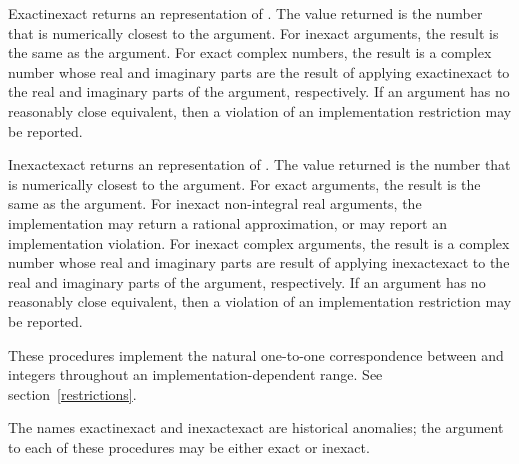 \begin{entry}{%
}

{\cf Exact\coerce{}inexact} returns an  representation of .
The value returned is the
 number that is numerically closest to the argument.  
For inexact arguments, the result is the same as the argument. For exact
complex numbers, the result is a complex number whose real and imaginary
parts are the result of applying {\cf exact\coerce{}inexact} to the real
and imaginary parts of the argument, respectively.
If an  argument has no reasonably close  equivalent,
then a violation of an implementation restriction may be reported.

{\cf Inexact\coerce{}exact} returns an  representation of
.  The value returned is the  number that is numerically
closest to the argument.
For exact arguments, the result is the same as the argument. For inexact
non-integral real arguments, the implementation may return a rational
approximation, or may report an implementation violation. For inexact
complex arguments, the result is a complex number whose real and
imaginary parts are result of applying {\cf inexact\coerce{}exact} to the
real and imaginary parts of the argument, respectively.
If an  argument has no reasonably close  equivalent,
then a violation of an implementation restriction may be reported.


These procedures implement the natural one-to-one correspondence between
 and  integers throughout an
implementation-dependent range.  See section~\ref{restrictions}.

\begin{note}
The names {\cf exact\coerce{}inexact} and {\cf
inexact\coerce{}exact} are historical anomalies; the argument to each of
these procedures may be either exact or inexact.
\end{note}

\end{entry}

